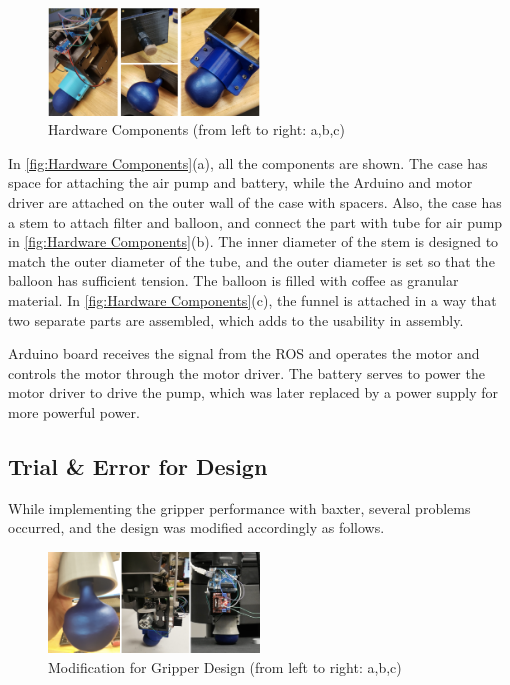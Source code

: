 \documentclass[conference,a4paper]{IEEEtran}
\begin{document}
\begin{figure}[h]
\centering
\includegraphics[width=0.5\textwidth]{Hardware_Components.png}
\caption{Hardware Components (from left to right: a,b,c)}
\label{fig:Hardware Components}
\end{figure}

In \autoref{fig:Hardware Components}(a), all the components are shown. The case has space for attaching the air pump and battery, while the Arduino and motor driver are attached on the outer wall of the case with spacers. Also, the case has a stem to attach filter and balloon, and connect the part with tube for air pump in \autoref{fig:Hardware Components}(b). The inner diameter of the stem is designed to match the outer diameter of the tube, and the outer diameter is set so that the balloon has sufficient tension. The balloon is filled with coffee as granular material. In \autoref{fig:Hardware Components}(c), the funnel is attached in a way that two separate parts are assembled, which adds to the usability in assembly.

Arduino board receives the signal from the ROS and operates the motor and controls the motor through the motor driver. The battery serves to power the motor driver to drive the pump, which was later replaced by a power supply for more powerful power.

\subsection{Trial \& Error for Design}

While implementing the gripper performance with baxter, several problems occurred, and the design was modified accordingly as follows.

\begin{figure}[h]
\centering
\includegraphics[width=0.5\textwidth]{Trial_Error.png}
\caption{Modification for Gripper Design (from left to right: a,b,c)}
\label{fig:Trial Error}
\end{figure}
\end{document}
